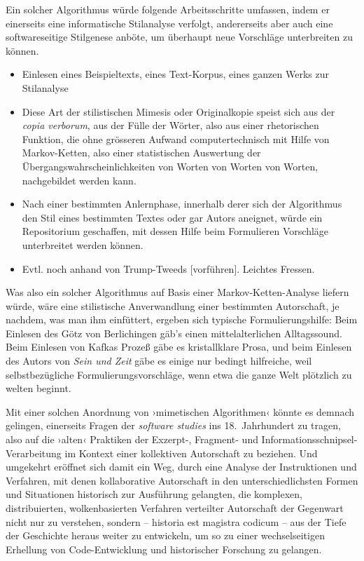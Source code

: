 \documentclass[a4paper,12pt]{article}
\newcommand{\inanf}[1]{›#1‹}
\newcommand{\ueber}[1]{{\color{crimson}[#1]}}
\begin{document}
Ein solcher Algorithmus würde folgende Arbeitsschritte umfassen, indem er einerseits eine informatische Stilanalyse verfolgt, andererseits aber auch eine softwareseitige Stilgenese anböte, um überhaupt neue Vorschläge unterbreiten zu können.

\begin{itemize}
\item Einlesen eines Beispieltexts, eines Text-Korpus, eines ganzen Werks zur Stilanalyse
\item Diese Art der stilistischen Mimesis oder Originalkopie speist sich aus der \emph{copia verborum}, aus der Fülle der Wörter, also aus einer rhetorischen Funktion, die ohne grösseren Aufwand computertechnisch mit Hilfe von Markov-Ketten, also einer statistischen Auswertung der Übergangswahrscheinlichkeiten von Worten von Worten von Worten, nachgebildet werden kann. 
%
\item Nach einer bestimmten Anlernphase, innerhalb derer sich der Algorithmus den Stil eines bestimmten Textes oder gar Autors aneignet, würde ein Repositorium geschaffen, mit dessen Hilfe beim Formulieren Vorschläge unterbreitet werden können. %
\item Evtl. noch anhand von Trump-Tweeds \ueber{vorführen}. Leichtes Fressen.
\end{itemize}
Was also ein solcher Algorithmus auf Basis einer Markov-Ketten-Analyse liefern würde, wäre eine stilistische Anverwandlung einer bestimmten Autorschaft, je nachdem, was man ihm einfüttert, ergeben sich typische Formulierungshilfe: Beim Einlesen des Götz von Berlichingen gäb's einen mittelalterlichen Alltagssound. Beim Einlesen von Kafkas Prozeß gäbe es kristallklare Prosa, und beim Einlesen des Autors von \emph{Sein und Zeit} gäbe es einige nur bedingt hilfreiche, weil selbstbezügliche Formulierungsvorschläge, wenn etwa die ganze Welt plötzlich zu welten beginnt.

Mit einer solchen Anordnung von \inanf{mimetischen Algorithmen} könnte es demnach gelingen, einerseits Fragen der \emph{software studies} ins 18.~Jahrhundert zu tragen, also auf die \inanf{alten} Praktiken der Exzerpt-, Fragment- und Informationsschnipsel-Verarbeitung im Kontext einer kollektiven Autorschaft zu beziehen. Und umgekehrt eröffnet sich damit ein Weg, durch eine Analyse der Instruktionen und Verfahren, mit denen kollaborative Autorschaft in den unterschiedlichsten Formen und Situationen historisch zur Ausführung gelangten, die komplexen, distribuierten, wolkenbasierten Verfahren verteilter Autorschaft der Gegenwart nicht nur zu verstehen, sondern – historia est magistra codicum – aus der Tiefe der Geschichte heraus weiter zu entwickeln, um so zu einer wechselseitigen Erhellung von Code-Entwicklung und historischer Forschung zu gelangen.
\end{document}
